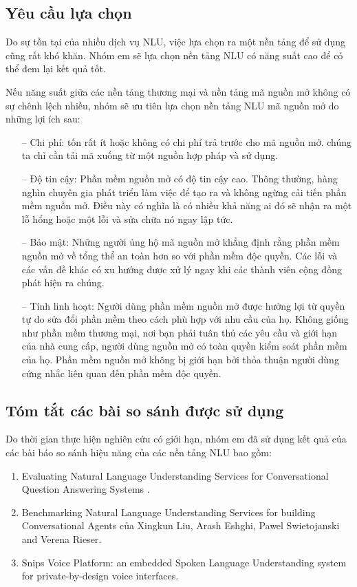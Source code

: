 \subsection{Yêu cầu lựa chọn}
Do sự tồn tại của nhiều dịch vụ NLU, việc lựa chọn ra một nền tảng để sử dụng cũng rất khó khăn. Nhóm em sẽ lựa chọn nền tảng NLU có năng suất cao để có thể đem lại kết quả tốt.

Nếu năng suất giữa các nền tảng thương mại và nền tảng mã nguồn mở không có sự chênh lệch nhiều, nhóm sẽ ưu tiên lựa chọn nền tảng NLU mã nguồn mở do những lợi ích sau:
\begin{itemize}
    \item[--] Chi phí:  tốn rất ít hoặc không có chi phí trả trước cho mã nguồn mở. chúng ta chỉ cần tải mã xuống từ một nguồn hợp pháp và sử dụng.
    \item[--] Độ tin cậy: Phần mềm nguồn mở có độ tin cậy cao. Thông thường, hàng nghìn chuyên gia phát triển làm việc để tạo ra và không ngừng cải tiến phần mềm nguồn mở. Điều này có nghĩa là có nhiều khả năng ai đó sẽ nhận ra một lỗ hổng hoặc một lỗi và sửa chữa nó ngay lập tức.
    \item[--] Bảo mật: Những người ủng hộ mã nguồn mở khẳng định rằng phần mềm nguồn mở về tổng thể an toàn hơn so với phần mềm độc quyền. Các lỗi và các vấn đề khác có xu hướng được xử lý ngay khi các thành viên cộng đồng phát hiện ra chúng.
    \item[--] Tính linh hoạt: Người dùng phần mềm nguồn mở được hưởng lợi từ quyền tự do sửa đổi phần mềm theo cách phù hợp với nhu cầu của họ. Không giống như phần mềm thương mại, nơi bạn phải tuân thủ các yêu cầu và giới hạn của nhà cung cấp, người dùng nguồn mở có toàn quyền kiểm soát phần mềm của họ. Phần mềm nguồn mở không bị giới hạn bởi thỏa thuận người dùng cứng nhắc liên quan đến phần mềm độc quyền.
\end{itemize}

\subsection{Tóm tắt các bài so sánh được sử dụng}

Do thời gian thực hiện nghiên cứu có giới hạn, nhóm em đã sử dụng kết quả của các bài báo so sánh hiệu năng của các nền tảng NLU bao gồm:

\begin{enumerate}
    \item Evaluating Natural Language Understanding Services for Conversational Question Answering Systems \cite{EvaluatingNLU}.
    \item Benchmarking Natural Language Understanding Services for building Conversational Agents của Xingkun Liu, Arash Eshghi, Pawel Swietojanski and Verena Rieser\cite{BenchmarkingNLU}.
    \item Snips Voice Platform: an embedded Spoken Language Understanding system for private-by-design voice interfaces\cite{snips-nlu}.
\end{enumerate}

